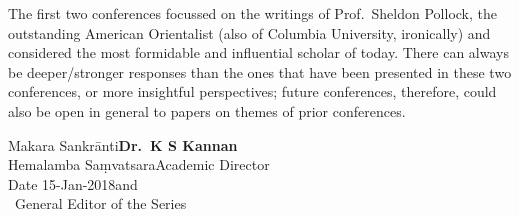 The first two conferences focussed on the writings of Prof.\ Sheldon Pollock, the outstanding American Orientalist (also of Columbia University, ironically) and considered the most formidable and influential scholar of today. There can always be deeper/stronger responses than the ones that have been presented in these two conferences, or more insightful perspectives; future conferences, therefore, could also be open in general to papers on themes of prior conferences.
\bigskip

\noindent
Makara Sankrānti\hfill	{\bf Dr.~K S Kannan}\\
Hemalamba Saṃvatsara\hfill Academic Director\\
Date 15-Jan-2018\hfill and\\	
\phantom{.}~\hfill General Editor of the Series                  





